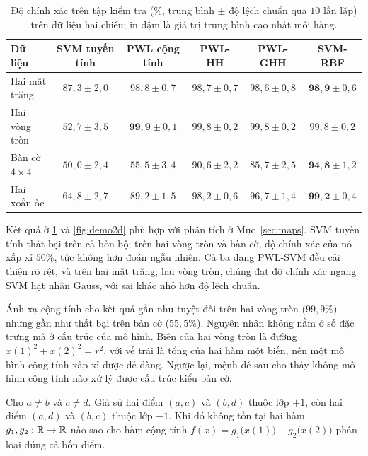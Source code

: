 \begin{table}[t]
\centering
\caption[Độ chính xác trên dữ liệu hai chiều]{Độ chính xác trên tập kiểm tra (\%, trung bình $\pm$ độ lệch chuẩn qua $10$ lần lặp) trên dữ liệu hai chiều; in đậm là giá trị trung bình cao nhất mỗi hàng.}
\label{tab:exp2d}
\small
\renewcommand{\arraystretch}{1.2}
\setlength{\tabcolsep}{4pt}
\begin{tabular}{@{}l c c c c c@{}}
\toprule
\textbf{Dữ liệu} & \textbf{SVM tuyến tính} & \textbf{PWL cộng tính} & \textbf{PWL-HH} & \textbf{PWL-GHH} & \textbf{SVM-RBF}\\
\midrule
Hai mặt trăng & $87{,}3\pm2{,}0$ & $98{,}8\pm0{,}7$ & $98{,}7\pm0{,}7$ & $98{,}6\pm0{,}8$ & $\mathbf{98{,}9}\pm0{,}6$\\
Hai vòng tròn & $52{,}7\pm3{,}5$ & $\mathbf{99{,}9}\pm0{,}1$ & $99{,}8\pm0{,}2$ & $99{,}8\pm0{,}2$ & $99{,}8\pm0{,}2$\\
Bàn cờ $4\times4$ & $50{,}0\pm2{,}4$ & $55{,}5\pm3{,}4$ & $90{,}6\pm2{,}2$ & $85{,}7\pm2{,}5$ & $\mathbf{94{,}8}\pm1{,}2$\\
Hai xoắn ốc & $64{,}8\pm2{,}7$ & $89{,}2\pm1{,}5$ & $98{,}2\pm0{,}6$ & $96{,}7\pm1{,}4$ & $\mathbf{99{,}2}\pm0{,}4$\\
\bottomrule
\end{tabular}
\end{table}

Kết quả ở \cref{tab:exp2d} và \cref{fig:demo2d} phù hợp với phân tích ở Mục~\ref{sec:maps}. SVM tuyến tính thất bại trên cả bốn bộ; trên hai vòng tròn và bàn cờ, độ chính xác của nó xấp xỉ $50\%$, tức không hơn đoán ngẫu nhiên. Cả ba dạng PWL-SVM đều cải thiện rõ rệt, và trên hai mặt trăng, hai vòng tròn, chúng đạt độ chính xác ngang SVM hạt nhân Gauss, với sai khác nhỏ hơn độ lệch chuẩn.

Ánh xạ cộng tính cho kết quả gần như tuyệt đối trên hai vòng tròn ($99{,}9\%$) nhưng gần như thất bại trên bàn cờ ($55{,}5\%$). Nguyên nhân không nằm ở số đặc trưng mà ở cấu trúc của mô hình. Biên của hai vòng tròn là đường $x(1)^2+x(2)^2=r^2$, với vế trái là tổng của hai hàm một biến, nên một mô hình cộng tính xấp xỉ được dễ dàng. Ngược lại, mệnh đề sau cho thấy không mô hình cộng tính nào xử lý được cấu trúc kiểu bàn cờ.

\begin{proposition}\label{prop:xor}
Cho $a\neq b$ và $c\neq d$. Giả sử hai điểm $(a,c)$ và $(b,d)$ thuộc lớp $+1$, còn hai điểm $(a,d)$ và $(b,c)$ thuộc lớp $-1$. Khi đó không tồn tại hai hàm $g_1,g_2:\mathbb{R}\to\mathbb{R}$ nào sao cho hàm cộng tính $f(x)=g_1\bigl(x(1)\bigr)+g_2\bigl(x(2)\bigr)$ phân loại đúng cả bốn điểm.
\end{proposition}

